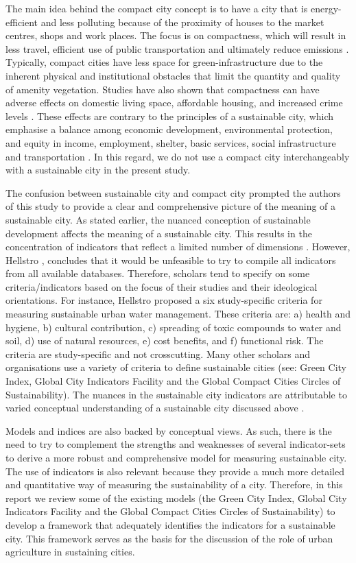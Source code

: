 The main idea behind the compact city concept is to have a city that is energy-efficient and less polluting because of the proximity of houses to the market centres, shops and work places. The focus is on compactness, which will result in less travel, efficient use of public transportation and ultimately reduce emissions \cite{Abdullahi2015}. Typically, compact cities have less space for green-infrastructure due to the inherent physical and institutional obstacles that limit the quantity and quality of amenity vegetation. Studies have also shown that compactness can have adverse effects on domestic living space, affordable housing, and increased crime levels \cite{Liu2017}. These effects are contrary to the principles of a sustainable city, which emphasise a balance among economic development, environmental protection, and equity in income, employment, shelter, basic services, social infrastructure and transportation \cite{Hiremath}. In this regard, we do not use a compact city interchangeably with a sustainable city in the present study.

The confusion between sustainable city and compact city prompted the authors of this study to provide a clear and comprehensive picture  of the meaning of a sustainable city. As stated earlier, the nuanced conception of sustainable development affects the meaning of a sustainable city. This results in the concentration of indicators that reflect a limited number of dimensions \cite{Tanguay2010}. However, Hellstro \cite{Hellstrom2000}, concludes that it would be unfeasible to try to compile all indicators from all available databases. Therefore, scholars tend to specify on some criteria/indicators based on the focus of their studies and their ideological orientations. For instance, Hellstro \cite{Hellstrom2000} proposed a six study-specific criteria for measuring sustainable urban water management. These criteria are: a) health and hygiene, b) cultural contribution, c) spreading of toxic compounds to water and soil, d) use of natural resources, e) cost benefits, and f) functional risk. The criteria are study-specific and not crosscutting. Many other scholars and organisations use a variety of criteria to define sustainable cities (see: Green City Index, Global City Indicators Facility and the Global Compact Cities Circles of Sustainability). The nuances in the sustainable city indicators are attributable to varied conceptual understanding of a sustainable city discussed above \cite{Huang2015}.

Models and indices are also backed by conceptual views. As such, there is the need to try to complement the strengths and weaknesses of several indicator-sets to derive a more robust and comprehensive model for measuring sustainable city. The use of indicators is also relevant because they provide a much more detailed and quantitative way of measuring the sustainability of a city. Therefore, in this report we review some of the existing models (the Green City Index, Global City Indicators Facility and the Global Compact Cities Circles of Sustainability) to develop a framework that adequately identifies the indicators for a sustainable city. This framework serves as the basis for the discussion of the role of urban agriculture in sustaining cities.

